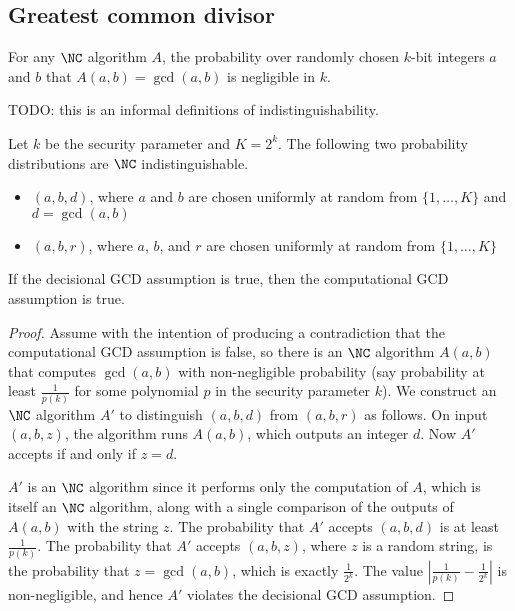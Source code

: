 \documentclass{article}
\begin{document}
\subsection{Greatest common divisor}

\begin{assumption}
  For any $\NC$ algorithm $A$, the probability over randomly chosen $k$-bit integers $a$ and $b$ that $A(a, b) = \gcd(a, b)$ is negligible in $k$.
\end{assumption}

\begin{assumption}
  TODO: this is an informal definitions of indistinguishability.

  Let $k$ be the security parameter and $K = 2^k$.
  The following two probability distributions are $\NC$ indistinguishable.
  \begin{itemize}
  \item $(a, b, d)$, where $a$ and $b$ are chosen uniformly at random from $\{1, \dotsc, K\}$ and $d = \gcd(a, b)$
  \item $(a, b, r)$, where $a$, $b$, and $r$ are chosen uniformly at random from $\{1, \dotsc, K\}$
  \end{itemize}
\end{assumption}

\begin{proposition}
  If the decisional GCD assumption is true, then the computational GCD assumption is true.
\end{proposition}
\begin{proof}
  Assume with the intention of producing a contradiction that the computational GCD assumption is false, so there is an $\NC$ algorithm $A(a, b)$ that computes $\gcd(a, b)$ with non-negligible probability (say probability at least $\frac{1}{p(k)}$ for some polynomial $p$ in the security parameter $k$).
  We construct an $\NC$ algorithm $A'$ to distinguish $(a, b, d)$ from $(a, b, r)$ as follows.
  On input $(a, b, z)$, the algorithm runs $A(a, b)$, which outputs an integer $d$.
  Now $A'$ accepts if and only if $z = d$.

  $A'$ is an $\NC$ algorithm since it performs only the computation of $A$, which is itself an $\NC$ algorithm, along with a single comparison of the outputs of $A(a, b)$ with the string $z$.
  The probability that $A'$ accepts $(a, b, d)$ is at least $\frac{1}{p(k)}$.
  The probability that $A'$ accepts $(a, b, z)$, where $z$ is a random string, is the probability that $z = \gcd(a, b)$, which is exactly $\frac{1}{2^k}$.
  The value $\left|\frac{1}{p(k)} - \frac{1}{2^k}\right|$ is non-negligible, and hence $A'$ violates the decisional GCD assumption.
\end{proof}
\end{document}
